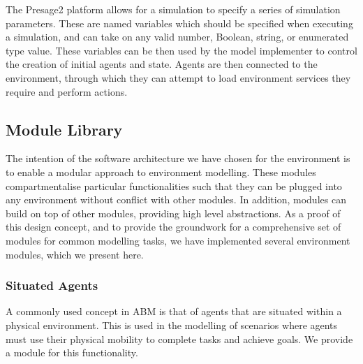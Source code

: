 The Presage2 platform allows for a simulation to specify a series of simulation
parameters. These are named variables which should be specified when executing a
simulation, and can take on any valid number, Boolean, string, or enumerated
type value. These variables can be then used by the model implementer to control
the creation of initial agents and state. Agents are then connected to the
environment, through which they can attempt to load environment services they
require and perform actions.

\subsection{Module Library}

The intention of the software architecture we have chosen for the environment is
to enable a modular approach to environment modelling. These modules
compartmentalise particular functionalities such that they can be plugged into
any environment without conflict with other modules. In addition, modules
can build on top of other modules, providing high level abstractions. As a proof
of this design concept, and to provide the groundwork for a comprehensive set of
modules for common modelling tasks, we have implemented several environment
modules, which we present here.

\subsubsection*{Situated Agents}

A commonly used concept in \ac{ABM} is that of agents that are situated within a
physical environment. This is used in the modelling of scenarios where agents
must use their physical mobility to complete tasks and achieve goals. We provide
a module for this functionality.

